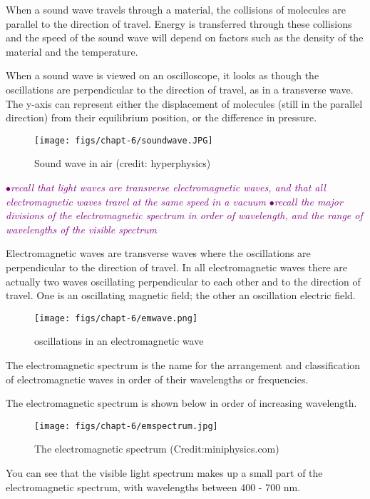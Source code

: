 \documentclass[a4paper,11pt,twoside]{memoir}
\newcounter{spec}[chapter]
\newcommand{\spec}[1]{\Needspace{5\baselineskip}\textcolor{purple}{$\bullet$\hspace{0.5cm}\textit{#1}}}
\begin{document}
When a sound wave travels through a material, the collisions of molecules are parallel to the direction of travel. Energy is transferred through these collisions and the speed of the sound wave will depend on factors such as the density of the material and the temperature.

When a sound wave is viewed on an oscilloscope, it looks as though the oscillations are perpendicular to the direction of travel, as in a transverse wave. The y-axis can represent either the displacement of molecules (still in the parallel direction) from their equilibrium position, or the difference in pressure.

\begin{figure}[h]
\texttt{[image: figs/chapt-6/soundwave.JPG]}
\caption{Sound wave in air (credit: hyperphysics)}
\label{Sound wave in air}
\end{figure}

\spec{recall that light waves are transverse electromagnetic waves, and that all electromagnetic waves travel at the same speed in a vacuum}
\spec{recall the major divisions of the electromagnetic spectrum in order of wavelength, and the range of wavelengths of the visible spectrum}

Electromagnetic waves are transverse waves where the oscillations are perpendicular to the direction of travel. In all electromagnetic waves there are actually two waves oscillating perpendicular to each other and to the direction of travel. One is an oscillating magnetic field; the other an oscillation electric field.

\begin{figure}[h!]
\texttt{[image: figs/chapt-6/emwave.png]}
\centering
\caption{oscillations in an electromagnetic wave}
\label{emwave}
\end{figure}

The electromagnetic spectrum is the name for the arrangement and classification of electromagnetic waves in order of their wavelengths or frequencies.

The electromagnetic spectrum is shown below in order of increasing wavelength.

\begin{figure}[h]
\texttt{[image: figs/chapt-6/emspectrum.jpg]}
\caption{The electromagnetic spectrum (Credit:miniphysics.com)}
\end{figure}

You can see that the visible light spectrum makes up a small part of the electromagnetic spectrum, with wavelengths between 400 - 700 nm.
\end{document}
